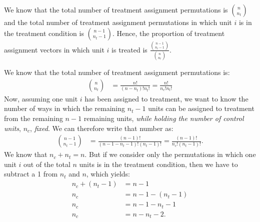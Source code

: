 \documentclass[11pt]{article}\usepackage[]{graphicx}\usepackage[]{color}
\theoremstyle{newstyle}
\begin{document}
We know that the total number of treatment assignment permutations is ${n \choose n_t}$ and the total number of treatment assignment permutations in which unit $i$ is in the treatment condition is ${n - 1 \choose n_t - 1}$. Hence, the proportion of treatment assignment vectors in which unit $i$ is treated is $\frac{{n - 1 \choose n_t - 1}}{{n \choose n_t}}$.

We know that the total number of treatment assignment permutations is:
\begin{align*}
{n \choose n_t} & = \frac{n!}{\left(n - n_t\right)!n_t!} = \frac{n!}{n_c!n_t!}
\end{align*}
Now, assuming one unit $i$ has been assigned to treatment, we want to know the number of ways in which the remaining $n_t - 1$ units can be assigned to treatment from the remaining $n - 1$ remaining units, \textit{while holding the number of control units}, $n_c$, \textit{fixed}. We can therefore write that number as:
\begin{align*}
{n - 1 \choose n_t - 1} & = \frac{\left(n - 1\right)!}{\left(n - 1 - n_t - 1\right)!\left(n_t - 1\right)!} = \frac{\left(n - 1\right)!}{n_c!\left(n_t - 1\right)!}.
\end{align*}
We know that $n_c + n_t = n$. But if we consider only the permutations in which one unit $i$ out of the total $n$ units is in the treatment condition, then we have to subtract a 1 from $n_t$ and $n$, which yields:
\begin{align*}
n_c + \left(n_t - 1\right) & = n - 1 \\
n_c  & = n - 1 - \left(n_t - 1\right) \\
n_c & = n - 1 - n_t - 1 \\
n_c & = n - n_t - 2.
\end{align*}
\end{document}
